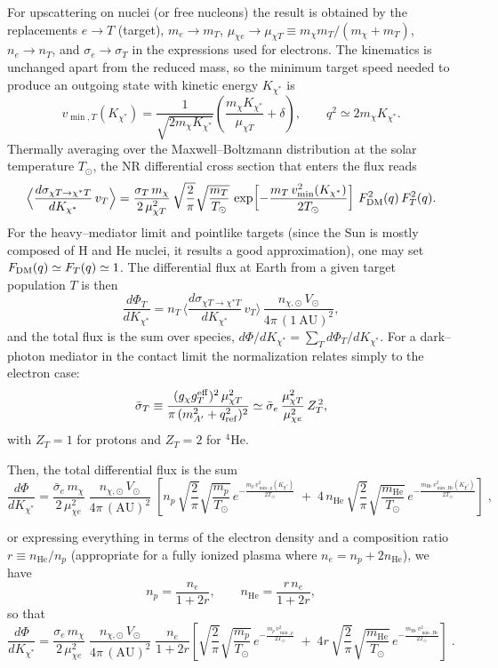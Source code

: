 \documentclass[13.1pt, letterpaper, twoside]{article}
\begin{document}
For upscattering on nuclei (or free nucleons) the result is obtained by the replacements $e\to T$ (target), $m_e\to m_T$, $\mu_{\chi e}\to \mu_{\chi T}\equiv m_\chi m_T/(m_\chi+m_T)$, $n_e\to n_T$, and $\sigma_e\to\sigma_T$ in the expressions used for electrons. The kinematics is unchanged apart from the reduced mass, so the minimum target speed needed to produce an outgoing state with kinetic energy $K_{\chi^\ast}$ is
\[
v_{\min, T}(K_{\chi^\ast})
=\frac{1}{\sqrt{2m_\chi K_{\chi^\ast}}}\left(\frac{m_\chi K_{\chi^\ast}}{\mu_{\chi T}}+\delta\right),
\qquad q^2\simeq 2m_\chi K_{\chi^\ast}.
\]
Thermally averaging over the Maxwell–Boltzmann distribution at the solar temperature $T_\odot$, the NR differential cross section that enters the flux reads
\[
\Big\langle \frac{d\sigma_{\chi T\to \chi^\ast T}}{dK_{\chi^\ast}}\,v_T \Big\rangle
=\frac{\sigma_T\,m_\chi}{2\,\mu_{\chi T}^2}\,
\sqrt{\frac{2}{\pi}}\sqrt{\frac{m_T}{T_\odot}}\,
\exp\!\left[-\frac{m_T\,v_{\min}^2(K_{\chi^\ast})}{2T_\odot}\right]\,
F_{\rm DM}^2(q)\,F_T^2(q).
\]
For the heavy–mediator limit and pointlike targets (since the Sun is mostly composed of H and He nuclei, it results a good approximation), one may set $F_{\rm DM}(q)\simeq F_T(q)\simeq 1$. The differential flux at Earth from a given target population $T$ is then
\[
\frac{d\Phi_T}{dK_{\chi^\ast}}
= n_T\,
\Big\langle \frac{d\sigma_{\chi T\to \chi^\ast T}}{dK_{\chi^\ast}}\,v_T \Big\rangle\,
\frac{n_{\chi,\odot}\,V_\odot}{4\pi\,(1~\mathrm{AU})^2},
\]
and the total flux is the sum over species, $d\Phi/dK_{\chi^\ast}=\sum_T d\Phi_T/dK_{\chi^\ast}$. For a dark–photon mediator in the contact limit the normalization relates simply to the electron case:
\[
 \bar\sigma_T
\equiv \frac{(g_\chi g_T^{\rm eff})^2\,\mu_{\chi T}^2}{\pi\,(m_{A'}^2+q_{\rm ref}^2)^2}
\simeq \bar\sigma_e\,\frac{\mu_{\chi T}^2}{\mu_{\chi e}^2}\,Z_T^{\,2},
\]
with \(Z_T=1\) for protons and \(Z_T=2\) for \(^4\)He. 

\noindent
Then, the total differential flux is the sum
\[
\boxed{
\frac{d\Phi}{dK_{\chi^\ast}}
=
\frac{\bar\sigma_e\,m_\chi}{2\,\mu_{\chi e}^2}\;
\frac{n_{\chi,\odot}\,V_\odot}{4\pi\,(\mathrm{AU})^2}\;
\left[
n_p\,\sqrt{\frac{2}{\pi}}\sqrt{\frac{m_p}{T_\odot}}\,
e^{-\frac{m_p\,v_{\min,p}^2(K_{\chi^\ast})}{2T_\odot}}
\;+\;
4\,n_{\mathrm{He}}\,\sqrt{\frac{2}{\pi}}\sqrt{\frac{m_{\mathrm{He}}}{T_\odot}}\,
e^{-\frac{m_{\mathrm{He}}\,v_{\min,\mathrm{He}}^2(K_{\chi^\ast})}{2T_\odot}}
\right]
}\; ,
\]

or expressing everything in terms of the electron density and a composition ratio $r\equiv n_{\mathrm{He}}/n_p$ (appropriate for a fully ionized plasma where $n_e=n_p+2n_{\mathrm{He}}$), we have
\[
n_p=\frac{n_e}{1+2r},\qquad n_{\mathrm{He}}=\frac{r\,n_e}{1+2r},
\]
so that
\[
\boxed{
\frac{d\Phi}{dK_{\chi^\ast}}
=
\frac{\sigma_e\,m_\chi}{2\,\mu_{\chi e}^2}\;
\frac{n_{\chi,\odot}\,V_\odot}{4\pi\,(\mathrm{AU})^2}\;
\frac{n_e}{1+2r}\left[
\sqrt{\frac{2}{\pi}}\sqrt{\frac{m_p}{T_\odot}}\,
e^{-\frac{m_p\,v_{\min,p}^2}{2T_\odot}}
\;+\;
4r\,\sqrt{\frac{2}{\pi}}\sqrt{\frac{m_{\mathrm{He}}}{T_\odot}}\,
e^{-\frac{m_{\mathrm{He}}\,v_{\min,\mathrm{He}}^2}{2T_\odot}}
\right]
}\; .
\]
\end{document}
